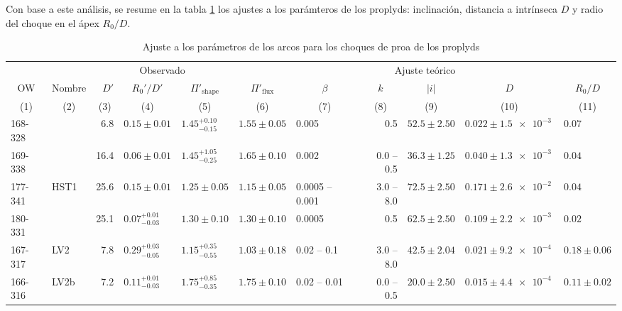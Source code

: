 Con base a este análisis, se resume en la tabla \ref{tab:arc-fits} los ajustes a los parámteros de los proplyds: inclinación, distancia a \thC{} intrínseca $D$ y radio del choque en el ápex $R_0/D$.
\begin{landscape}
\begin{table}
  \caption{Ajuste a los parámetros de los arcos para los choques de proa de los proplyds}
  \label{tab:arc-fits} 
  \newcommand\C[1]{\multicolumn{1}{c}{#1}}
  \begin{adjustbox}{width=1.35\textwidth}
    \small
\begin{tabular}{llrllllrlll}\toprule
             &          & \multicolumn{3}{c}{\dotfill Observado \dotfill}              & \multicolumn{6}{c}{\dotfill Ajuste teórico \dotfill} \\ 
  \C{OW}     & \C{Nombre} & \(D'\) &\C{ \(R_0'/D'\) }&\C{ \(\Pi'_{\mathrm{shape}}\) }&\C{ \(\Pi'_{\mathrm{flux}}\) }&\C{ \(\beta\) }&\C{ \(k\) }&\C{ \(|i|\) }&\C{ \(D\) }&\C{ \(R_0/D\)}\\
  \C{(1)}& \C{ (2) }&\C{ (3)    }&\C{    (4)      }&\C{              (5)           }&\C{           (6)             }&\C{     (7)   }&\C{   (8)   }&\C{   (9) }&\C{  (10) }&\C{   (11)} \\
\midrule     
 168-328  &            &    6.8  &  $0.15 \pm 0.01$  &  $1.45^{+0.10}_ {-0.15}$   &  $1.55 \pm 0.05$     &  0.005  &  0.5  &  $52.5 \pm 2.50$   &  $0.022 \pm \SI{1.5e-3}{}$  &  $0.07$  \\
 169-338  &            &  16.4  &  $0.06 \pm 0.01$  &  $1.45^{+1.05}_{-0.25}$   &  $1.65 \pm 0.10$     &  0.002  &  0.0 -- 0.5  &  $36.3 \pm 1.25$   &  $0.040 \pm \SI{1.3e-3}{}$  &  $0.04$  \\
 177-341  & HST1   & 25.6  &  $0.15 \pm 0.01$  &  $1.25 \pm 0.05$   &  $1.15 \pm 0.05$     &  0.0005 -- 0.001  &  3.0 -- 8.0  &  $72.5 \pm 2.50$   &  $0.171 \pm \SI{2.6e-2}{}$  &  $0.04$  \\
 180-331  &             &  25.1  &  $0.07^{+0.01}_{-0.03}$  &  $1.30 \pm 0.10$   &  $1.30 \pm 0.10$     &  0.0005  &  0.5  &  $62.5 \pm 2.50$   &  $0.109 \pm \SI{2.2e-3}{}$  &  $0.02$  \\
 167-317  &  LV2     &    7.8  &  $0.29^{+0.03}_{-0.05}$  &  $1.15^{+0.35}_{-0.55}$   &  $1.03 \pm 0.18$      &  0.02 -- 0.1  &  3.0 -- 8.0  &  $42.5 \pm 2.04$  &  $0.021 \pm \SI{9.2e-4}{}$  &  $0.18 \pm 0.06$  \\
 166-316  & LV2b    &   7.2  &  $0.11^{+0.01}_{-0.03}$  &  $1.75^{+0.85}_{-0.35}$   &  $1.75 \pm 0.10$     &  0.02 -- 0.01  &  0.0 -- 0.5  &  $20.0 \pm 2.50$  &  $0.015 \pm \SI{4.4e-4}{}$  &  $0.11 \pm 0.02$  \\

\end{tabular}
\end{adjustbox}
\end{table}
\end{landscape}
